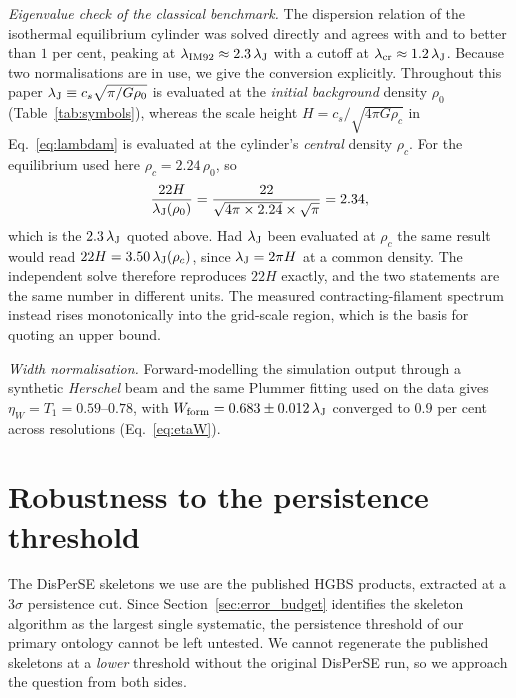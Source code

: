 \documentclass[usenatbib,twoside,twocolumn]{mnras}
\begin{document}
\emph{Eigenvalue check of the classical benchmark.} The dispersion relation of the isothermal equilibrium cylinder was solved directly and agrees with \citet{Nagasawa1987} and \citet{Fischera2012} to better than $1$ per cent, peaking at $\lambda_{\rm IM92}\approx2.3\,\lambda_{\rm J}$ with a cutoff at $\lambda_{\rm cr}\approx1.2\,\lambda_{\rm J}$. Because two normalisations are in use, we give the conversion explicitly. Throughout this paper $\lambda_{\rm J}\equiv c_s\sqrt{\pi/G\rho_0}$ is evaluated at the \emph{initial background} density $\rho_0$ (Table~\ref{tab:symbols}), whereas the scale height $H=c_s/\sqrt{4\pi G\rho_c}$ in Eq.~\ref{eq:lambdam} is evaluated at the cylinder's \emph{central} density $\rho_c$. For the equilibrium used here $\rho_c=2.24\,\rho_0$, so
\begin{equation}
\frac{22H}{\lambda_{\rm J}(\rho_0)}=\frac{22}{\sqrt{4\pi\times2.24}\times\sqrt{\pi}}=2.34,
\label{eq:hconv}
\end{equation}
which is the $2.3\,\lambda_{\rm J}$ quoted above. Had $\lambda_{\rm J}$ been evaluated at $\rho_c$ the same result would read $22H=3.50\,\lambda_{\rm J}(\rho_c)$, since $\lambda_{\rm J}=2\pi H$ at a common density. The independent solve therefore reproduces $22H$ exactly, and the two statements are the same number in different units. The measured contracting-filament spectrum instead rises monotonically into the grid-scale region, which is the basis for quoting an upper bound.

\emph{Width normalisation.} Forward-modelling the simulation output through a synthetic \textit{Herschel} beam and the same Plummer fitting used on the data gives $\eta_W=T_1=0.59$--$0.78$, with $W_{\rm form}=0.683\pm0.012\,\lambda_{\rm J}$ converged to $0.9$ per cent across resolutions (Eq.~\ref{eq:etaW}).



\section{Robustness to the persistence threshold}
\label{sec:persistence}

The DisPerSE skeletons we use are the published HGBS products, extracted at a $3\sigma$ persistence cut. Since Section~\ref{sec:error_budget} identifies the skeleton algorithm as the largest single systematic, the persistence threshold of our primary ontology cannot be left untested. We cannot regenerate the published skeletons at a \emph{lower} threshold without the original DisPerSE run, so we approach the question from both sides.
\end{document}
